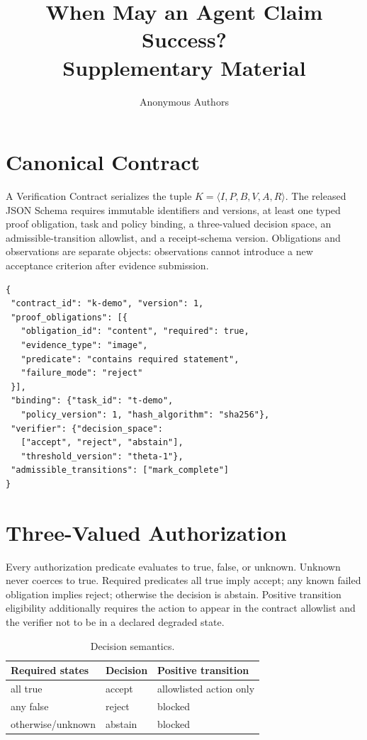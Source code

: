 \documentclass[sigconf,anonymous,review]{acmart}
\title{When May an Agent Claim Success?\\Supplementary Material}
\author{Anonymous Authors}
\begin{document}
\maketitle

\section{Canonical Contract}
A Verification Contract serializes the tuple $K=\langle I,P,B,V,A,R\rangle$. The released JSON Schema requires immutable identifiers and versions, at least one typed proof obligation, task and policy binding, a three-valued decision space, an admissible-transition allowlist, and a receipt-schema version. Obligations and observations are separate objects: observations cannot introduce a new acceptance criterion after evidence submission.

\begin{lstlisting}[basicstyle=\ttfamily\scriptsize,breaklines=true,frame=single]
{
 "contract_id": "k-demo", "version": 1,
 "proof_obligations": [{
   "obligation_id": "content", "required": true,
   "evidence_type": "image",
   "predicate": "contains required statement",
   "failure_mode": "reject"
 }],
 "binding": {"task_id": "t-demo",
   "policy_version": 1, "hash_algorithm": "sha256"},
 "verifier": {"decision_space":
   ["accept", "reject", "abstain"],
   "threshold_version": "theta-1"},
 "admissible_transitions": ["mark_complete"]
}
\end{lstlisting}

\section{Three-Valued Authorization}
Every authorization predicate evaluates to true, false, or unknown. Unknown never coerces to true. Required predicates all true imply accept; any known failed obligation implies reject; otherwise the decision is abstain. Positive transition eligibility additionally requires the action to appear in the contract allowlist and the verifier not to be in a declared degraded state.

\begin{table}[h]
\centering
\caption{Decision semantics.}
\begin{tabular}{lll}
\toprule
Required states & Decision & Positive transition \\
\midrule
all true & accept & allowlisted action only \\
any false & reject & blocked \\
otherwise/unknown & abstain & blocked \\
\bottomrule
\end{tabular}
\end{table}
\end{document}
